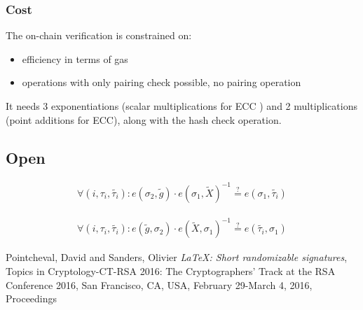 \documentclass[11pt]{article}
\newenvironment{optimization}{\par\color{blue}}{\par}
\begin{document}
    \subsubsection{Cost}
    \begin{optimization}
        The on-chain verification is constrained on:
        \begin{itemize}
            \item efficiency in terms of gas
            \item operations with only pairing check possible, no pairing operation
        \end{itemize}
        It needs 3 exponentiations (scalar multiplications for ECC ) and 2 multiplications (point additions for ECC), along with the hash check operation.
    \end{optimization}

    \subsection{Open}
    \begin{align}
        \forall (i, \tau_i, \tilde{\tau_i}) :
        e(\sigma_2,\tilde{g})\cdot e(\sigma_1, \tilde{X})^{-1}\stackrel{?}{=} e(\sigma_1, \tilde{\tau_i})
    \end{align}
    \begin{optimization}
        \begin{align}
            \forall (i, \tau_i, \tilde{\tau_i}) :
            e(\tilde{g},\sigma_2)\cdot e( \tilde{X}, \sigma_1)^{-1}\stackrel{?}{=} e( \tilde{\tau_i},\sigma_1)
        \end{align}
    \end{optimization}

    \pagebreak
    \begin{thebibliography}{9}
        Pointcheval, David and Sanders, Olivier \emph{\LaTeX: Short randomizable signatures}, Topics in Cryptology-CT-RSA 2016: The Cryptographers' Track at the RSA Conference 2016, San Francisco, CA, USA, February 29-March 4, 2016, Proceedings
    \end{thebibliography}
\end{document}
